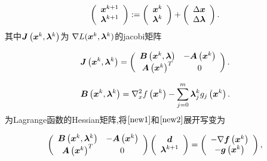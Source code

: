 \documentclass[12pt,oneside,a4paper]{article}
\begin{document}
\begin{equation}\label{new2}
\left(\begin{array}{c}
{\boldsymbol x}^{k+1} \\
\boldsymbol{ \lambda}^{k+1}
\end{array}\right):=\left(\begin{array}{c}
{\boldsymbol x}^{k} \\
\boldsymbol{ \lambda}^{k}
\end{array}\right)+\left(\begin{array}{c}
\Delta {\boldsymbol x} \\
\Delta \boldsymbol{ \lambda}
\end{array}\right).
\end{equation}
其中${\boldsymbol J}\left({\boldsymbol x}^{k}, \boldsymbol{\lambda}^{k}\right)$为
$\nabla L({\boldsymbol x}^k, \boldsymbol{ \lambda}^k)$的jacobi矩阵

\begin{equation*}
{\boldsymbol J}\left({\boldsymbol x}^{k}, \boldsymbol{\lambda}^{k}\right)=\left(\begin{array}{cc}
{\boldsymbol B}\left({\boldsymbol x}^{k}, \boldsymbol{ \lambda}\right) & -{\boldsymbol A}\left({\boldsymbol x}^{k}\right) \\
{\boldsymbol A}\left({\boldsymbol x}^{k}\right)^{T} & 0
\end{array}\right).
\end{equation*}

\begin{equation*}
{\boldsymbol B}\left({\boldsymbol x}^{k}, \boldsymbol{\lambda}^{k}\right)=\nabla_{x}^{2} f\left({\boldsymbol x}^{k}\right)-
\sum_{j=0}^{m} \boldsymbol{\lambda}_{j}^{k} g_{j}\left({\boldsymbol x}^{k}\right).
\end{equation*}
为Lagrange函数的Hessian矩阵,将$\ref{new1}$和$\ref{new2}$展开写变为

\begin{equation}\label{fin}
\left(\begin{array}{cc}
{\boldsymbol B}\left({\boldsymbol x}^{k}, \boldsymbol{\lambda}^{k}\right) & -{\boldsymbol A}\left({\boldsymbol x}^{k}\right) \\
{\boldsymbol A}\left({\boldsymbol x}^{k}\right)^{T} & 0
\end{array}\right)\left(\begin{array}{c}
{\boldsymbol d} \\
\boldsymbol{\lambda}^{k+1}
\end{array}\right)=\left(\begin{array}{c}
-\nabla {\boldsymbol f}\left({\boldsymbol x}^{k}\right) \\
-{\boldsymbol g}\left({\boldsymbol x}^{k}\right)
\end{array}\right),
\end{equation}
\end{document}
